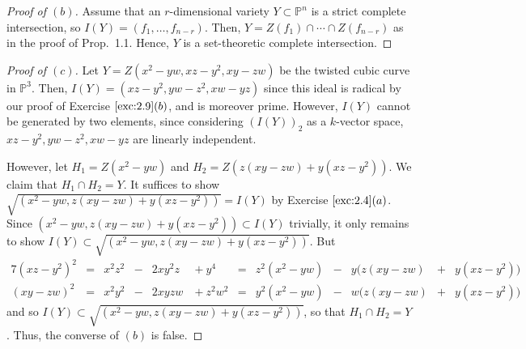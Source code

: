 \documentclass[12pt,letterpaper]{article}
\theoremstyle{definition}
\theoremstyle{remark}
\numberwithin{equation}{section}
\numberwithin{figure}{problem}
\newcommand{\PP}{\mathbb{P}}
\begin{document}
\begin{proof}[Proof of $(b)$]
  Assume that an $r$-dimensional variety $Y \subset \PP^n$ is a strict complete
  intersection, so $I(Y) = (f_1, \ldots, f_{n-r})$.
  Then, $Y = Z(f_1) \cap \cdots \cap Z(f_{n-r})$ as in the proof of
  Prop.~1.1. Hence, $Y$ is a set-theoretic complete intersection. 
\end{proof}
\begin{proof}[Proof of $(c)$]
  Let $Y = Z(x^2-yw,xz-y^2,xy-zw)$ be the twisted cubic curve in $\PP^3$. Then,
  $I(Y) = (xz-y^2, yw-z^2, xw-yz)$ since this ideal is radical by our proof of
  Exercise $\ref{exc:2.9}(b)$, and is moreover prime. However, $I(Y)$ cannot be
  generated by two elements, since considering $(I(Y))_2$ as a $k$-vector space,
  $xz-y^2, yw-z^2, xw-yz$ are linearly independent.
  \par However, let $H_1 = Z(x^2-yw)$ and $H_2 = Z(z(xy-zw)+y(xz-y^2))$. We
  claim that $H_1 \cap H_2 = Y$. It suffices to show
  $\sqrt{(x^2-yw,z(xy-zw)+y(xz-y^2))} = I(Y)$ by Exercise $\ref{exc:2.4}(a)$.
  Since $(x^2-yw,z(xy-zw)+y(xz-y^2)) \subset I(Y)$ trivially, it only remains to
  show $I(Y) \subset \sqrt{(x^2-yw,z(xy-zw)+y(xz-y^2))}$. But
  \begin{alignat*}{7}
    (xz-y^2)^2 &={}& x^2z^2 &-{}& 2xy^2z &{}+ y^4 &{}={}& z^2(x^2-yw) &{}-{}&
    y(z(xy-zw)&{}+{}&y(xz-y^2))\\
    (xy-zw)^2 &={}& x^2y^2 &-{}& 2xyzw &{}+ z^2w^2 &{}={}& y^2(x^2-yw) &{}-{}&
    w(z(xy-zw)&{}+{}&y(xz-y^2))
  \end{alignat*}
  and so $I(Y) \subset \sqrt{(x^2-yw,z(xy-zw)+y(xz-y^2))}$, so that
  $H_1 \cap H_2 = Y$. Thus, the converse of $(b)$ is false.
\end{proof}

\printbibliography
\end{document}
